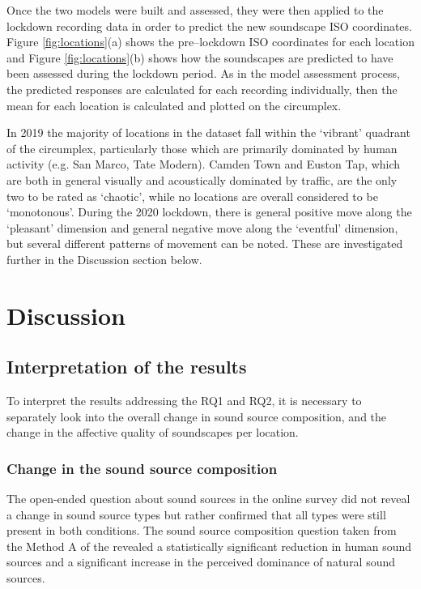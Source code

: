 Once the two models were built and assessed, they were then applied to the lockdown recording data in order to predict the new soundscape ISO coordinates. Figure \ref{fig:locations}(a) shows the pre--lockdown ISO coordinates for each location and Figure \ref{fig:locations}(b) shows how the soundscapes are predicted to have been assessed during the lockdown period. As in the model assessment process, the predicted responses are calculated for each recording individually, then the mean for each location is calculated and plotted on the circumplex.

In 2019 the majority of locations in the dataset fall within the ‘vibrant’ quadrant of the circumplex, particularly those which are primarily dominated by human activity (e.g. San Marco, Tate Modern). Camden Town and Euston Tap, which are both in general visually and acoustically dominated by traffic, are the only two to be rated as ‘chaotic’, while no locations are overall considered to be ‘monotonous’. During the 2020 lockdown, there is general positive move along the ‘pleasant’ dimension and general negative move along the ‘eventful' dimension, but several different patterns of movement can be noted. These are investigated further in the Discussion section below.

\section{Discussion}

\subsection{Interpretation of the results}

To interpret the results addressing the RQ1 and RQ2, it is necessary to separately look into the overall change in sound source composition, and the change in the affective quality of soundscapes per location. 

\subsubsection{Change in the sound source composition}

The open-ended question about sound sources in the online survey did not reveal a change in sound source types but rather confirmed that all types were still present in both conditions. The sound source composition question taken from the Method A of the \citet{international_organisation_for_standardization_isots_2018} revealed a statistically significant reduction in human sound sources and a significant increase in the perceived dominance of natural sound sources. %

